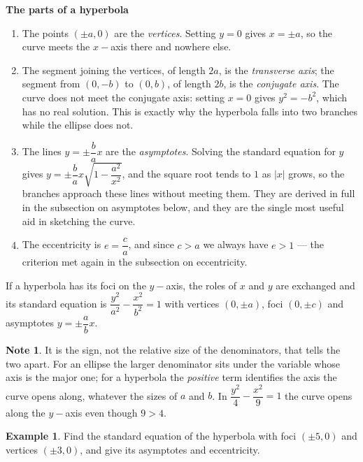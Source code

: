\documentclass[11pt,a4paper]{article}
\theoremstyle{definition}
\newtheorem{exa}[thm]{Example}
\newtheorem*{note}{Note}
\newcommand{\subhead}[1]{%
  \par\medskip\noindent\textbf{#1}\par\nobreak\smallskip}
\begin{document}
\subhead{The parts of a hyperbola}
\begin{enumerate}
\item[i] The points $(\pm a, 0)$ are the \emph{vertices}. Setting $y=0$ gives
$x = \pm a$, so the curve meets the $x-$axis there and nowhere else.
\item[ii] The segment joining the vertices, of length $2a$, is the
\emph{transverse axis}; the segment from $(0,-b)$ to $(0,b)$, of length $2b$, is
the \emph{conjugate axis}. The curve does not meet the conjugate axis: setting
$x=0$ gives $y^2 = -b^2$, which has no real solution. This is exactly why the
hyperbola falls into two branches while the ellipse does not.
\item[iii] The lines $y = \pm\dfrac{b}{a}x$ are the \emph{asymptotes}. Solving
the standard equation for $y$ gives
$y = \pm\dfrac{b}{a}x\sqrt{1 - \dfrac{a^2}{x^2}}$, and the square root tends to
$1$ as $|x|$ grows, so the branches approach these lines without meeting them.
They are derived in full in the subsection on asymptotes below, and they are the
single most useful aid in sketching the curve.
\item[iv] The eccentricity is $e = \dfrac{c}{a}$, and since $c>a$ we always have
$e>1$ --- the criterion met again in the subsection on eccentricity.
\end{enumerate}

If a hyperbola has its foci on the $y-$axis, the roles of $x$ and $y$ are
exchanged and its standard equation is
\hspace{0.2cm}$\boxed{\dfrac{y^2}{a^2} - \dfrac{x^2}{b^2} = 1}$\hspace{0.2cm}
with vertices $(0,\pm a)$, foci $(0,\pm c)$ and asymptotes
$y = \pm\dfrac{a}{b}x$.

\begin{note}
It is the sign, not the relative size of the denominators, that tells the two
apart. For an ellipse the larger denominator sits under the variable whose axis
is the major one; for a hyperbola the \emph{positive} term identifies the axis
the curve opens along, whatever the sizes of $a$ and $b$. In
$\dfrac{y^2}{4} - \dfrac{x^2}{9} = 1$ the curve opens along the $y-$axis even
though $9>4$.
\end{note}

\begin{exa}
Find the standard equation of the hyperbola with foci $(\pm 5, 0)$ and vertices
$(\pm 3, 0)$, and give its asymptotes and eccentricity.
\end{exa}
\end{document}
